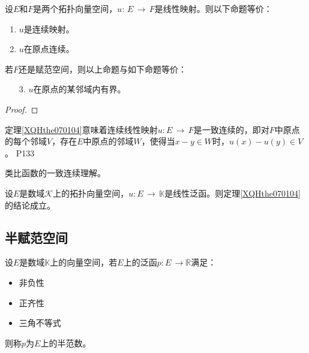 \begin{theorem}\label{XQHthe070104}
	设$E$和$F$是两个拓扑向量空间，$u:\, E\, \rightarrow \, F $是线性映射。则以下命题等价：
	\begin{enumerate}
		\item $u$是连续映射。
		\item $u$在原点连续。
	\end{enumerate}
	若$F$还是赋范空间，则以上命题与如下命题等价：
	\begin{enumerate}
		\item[3.] $u$在原点的某邻域内有界。 
	\end{enumerate}
\end{theorem}

\begin{proof}
	
\end{proof}

\original
{定理\ref{XQHthe070104}意味着连续线性映射$u:E\, \rightarrow \, F $是一致连续的，即对$F$中原点的每个邻域$V$，存在$E$中原点的邻域$W$，使得当$x-y\in W $时，$u(x)-u(y) \in V $。
}
{P133}
\begin{remark}
	类比函数的一致连续理解。
\end{remark}

\begin{corollary}
	设$E$是数域$\mathcal{K}$上的拓扑向量空间，$u:E\, \rightarrow \, \mathbb{K} $是线性泛函。则定理\ref{XQHthe070104}的结论成立。
\end{corollary}


\subsection{半赋范空间}

\begin{definition}
	设$E$是数域$\mathbb{K}$上的向量空间，若$E$上的泛函$p: E\, \rightarrow \mathbb{R} $满足：
	\begin{itemize}
		\item 非负性
		\item 正齐性
		\item 三角不等式
	\end{itemize}
	则称$p$为$E$上的半范数。
\end{definition}

